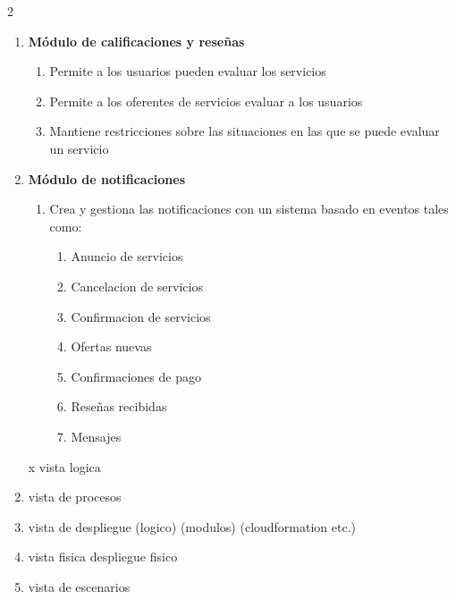 \documentclass{article}
\begin{document}
\begin {multicols}{2}
\begin{enumerate}
\begin{enumerate}
        \end{enumerate}
      \item \textbf{Módulo de calificaciones y reseñas   }
        \begin{enumerate} 
          \item Permite a los usuarios pueden evaluar los servicios
          \item Permite a los oferentes de servicios evaluar a los usuarios
          \item Mantiene restricciones sobre las situaciones en las que se puede evaluar un servicio
        \end{enumerate} 
      \item \textbf{Módulo de notificaciones}
      \begin{enumerate}
        \item Crea y gestiona las notificaciones con un sistema basado en eventos tales como: 
          \begin{enumerate}
            \item Anuncio de servicios
            \item Cancelacion de servicios
            \item Confirmacion de servicios
            \item Ofertas nuevas 
            \item Confirmaciones de pago 
            \item Reseñas recibidas  
            \item Mensajes 
          \end{enumerate}
      \end{enumerate} 

    \end{enumerate}
  \end{multicols}





      \begin{enumerate}
        \item [x] vista logica
        \item vista de procesos
        \item vista de despliegue
            (logico)
            (modulos)
            (cloudformation etc.)
        \item vista fisica
          despliegue fisico
        \item vista de escenarios

      \end{enumerate}
      
\end{document}
